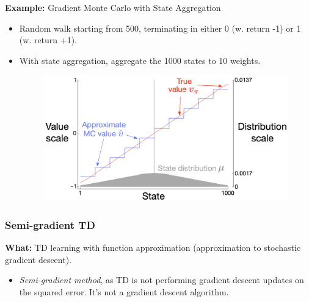\documentclass[12pt, a4paper]{article}
\begin{document}
\bigskip

\textbf{Example:} Gradient Monte Carlo with State Aggregation
\begin{itemize}
  \item Random walk starting from 500, terminating in either 0 (w. return -1) or 1 (w. return +1).
  \item With state aggregation, aggregate the 1000 states to 10 weights.
  \begin{figure}[H]
    \centering
      \includegraphics[width=0.8\columnwidth]{images/gradient-monte-carlo-with-state-aggregation.png}
      \label{fig:gradient-monte-carlo-with-state-aggregation}
  \end{figure}
\end{itemize}






\subsubsection{Semi-gradient TD}\label{semi-gradient-td}

\textbf{What:} TD learning with function approximation (approximation to stochastic gradient descent).

\begin{itemize}
  \item \textit{Semi-gradient method}, as TD is not performing gradient descent updates on the squared error. It's not a gradient descent algorithm.
\end{itemize}
\end{document}
